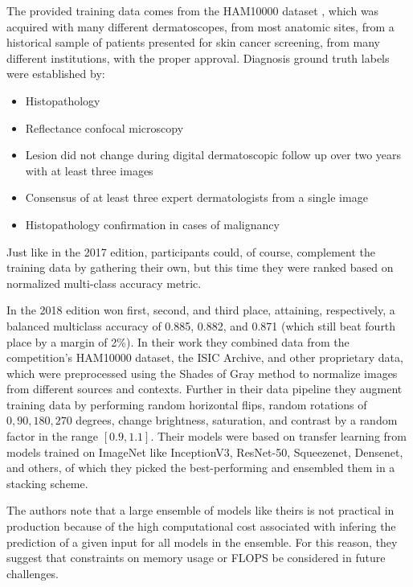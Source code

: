 The provided training data comes from the \ac{HAM10000} dataset \cite{ham10000}, which was acquired with many different dermatoscopes, from most anatomic sites, from a historical sample of patients presented for skin cancer screening, from many different institutions, with the proper approval. Diagnosis ground truth labels were established by:

\begin{itemize}
    \item Histopathology
    \item Reflectance confocal microscopy
    \item Lesion did not change during digital dermatoscopic follow up over two years with at least three images
    \item Consensus of at least three expert dermatologists from a single image
    \item Histopathology confirmation in cases of malignancy
\end{itemize}

Just like in the 2017 edition, participants could, of course, complement the training data by gathering their own, but this time they were ranked based on normalized multi-class accuracy metric.

In the 2018 edition \citeauthor{isic2018first} \cite{isic2018first} won first, second, and third place, attaining, respectively, a balanced multiclass accuracy of 0.885, 0.882, and 0.871 (which still beat fourth place by a margin of 2\%). In their work they combined data from the competition's \ac{HAM10000} dataset, the \ac{ISIC} Archive, and other proprietary data, which were preprocessed using the Shades of Gray method to normalize images from different sources and contexts. Further in their data pipeline they augment training data by performing random horizontal flips, random rotations of ${0, 90, 180, 270}$ degrees, change brightness, saturation, and contrast by a random factor in the range $[0.9, 1.1]$. Their models were based on transfer learning from models trained on ImageNet like InceptionV3, ResNet-50, Squeezenet, Densenet, and others, of which they picked the best-performing and ensembled them in a stacking scheme.

The authors note that a large ensemble of models like theirs is not practical in production because of the high computational cost associated with infering the prediction of a given input for all models in the ensemble. For this reason, they suggest that constraints on memory usage or \ac{FLOPS} be considered in future challenges.

